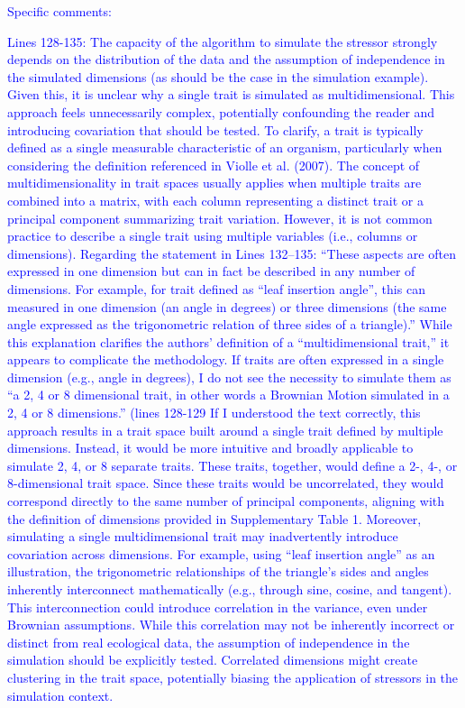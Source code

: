 \documentclass[
]{article}
\begin{document}
\textcolor{blue}{Specific comments: }

\textcolor{blue}{Lines 128-135: The capacity of the algorithm to simulate the stressor strongly depends on the distribution of the data and the assumption of independence in the simulated dimensions (as should be the case in the simulation example). Given this, it is unclear why a single trait is simulated as multidimensional. This approach feels unnecessarily complex, potentially confounding the reader and introducing covariation that should be tested. To clarify, a trait is typically defined as a single measurable characteristic of an organism, particularly when considering the definition referenced in Violle et al. (2007). The concept of multidimensionality in trait spaces usually applies when multiple traits are combined into a matrix, with each column representing a distinct trait or a principal component summarizing trait variation. However, it is not common practice to describe a single trait using multiple variables (i.e., columns or dimensions). Regarding the statement in Lines 132–135:
“These aspects are often expressed in one dimension but can in fact be described in any number of dimensions. For example, for trait defined as “leaf insertion angle”, this can measured in one dimension (an angle in degrees) or three dimensions (the same angle expressed as the trigonometric relation of three sides of a triangle).”
While this explanation clarifies the authors’ definition of a “multidimensional trait,” it appears to complicate the methodology. If traits are often expressed in a single dimension (e.g., angle in degrees), I do not see the necessity to simulate them as “a 2, 4 or 8 dimensional trait, in other words a Brownian Motion simulated in a 2, 4 or 8 dimensions.” (lines 128-129 If I understood the text correctly, this approach results in a trait space built around a single trait defined by multiple dimensions. Instead, it would be more intuitive and broadly applicable to simulate 2, 4, or 8 separate traits. These traits, together, would define a 2-, 4-, or 8-dimensional trait space. Since these traits would be uncorrelated, they would correspond directly to the same number of principal components, aligning with the definition of dimensions provided in Supplementary Table 1.
Moreover, simulating a single multidimensional trait may inadvertently introduce covariation across dimensions. For example, using “leaf insertion angle” as an illustration, the trigonometric relationships of the triangle’s sides and angles inherently interconnect mathematically (e.g., through sine, cosine, and tangent). This interconnection could introduce correlation in the variance, even under Brownian assumptions. While this correlation may not be inherently incorrect or distinct from real ecological data, the assumption of independence in the simulation should be explicitly tested. Correlated dimensions might create clustering in the trait space, potentially biasing the application of stressors in the simulation context. 
}
\end{document}
